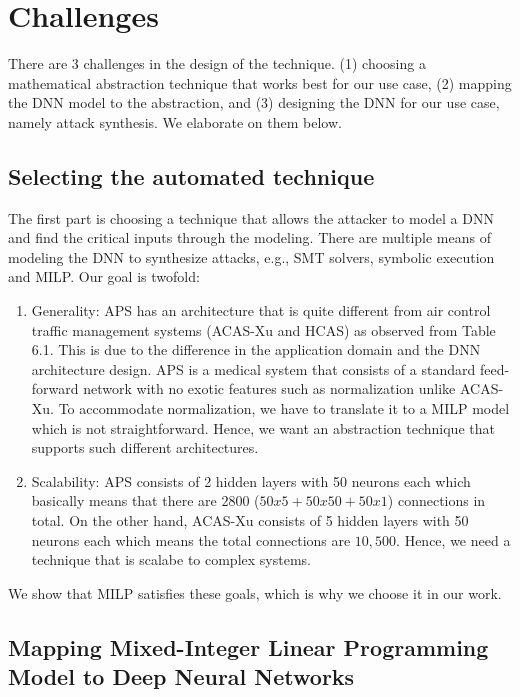 \section{Challenges}
There are 3 challenges in the design of the technique. 
(1) choosing a mathematical abstraction technique that works best for our use case, 
(2) mapping the \ac{DNN}  model to the abstraction, and 
(3) designing the \ac{DNN}  for our use case, namely attack synthesis. 
We elaborate on them below. 


\subsection{Selecting  the automated technique}
The first part is choosing a technique that allows the attacker to model a DNN and find the critical inputs through the modeling. 
There are multiple means of modeling the DNN to synthesize attacks, e.g., SMT solvers, symbolic execution and MILP.
Our goal is twofold: 
\begin{enumerate}
	\item Generality: \ac{APS} has an architecture that %
	is quite different from air control traffic management systems (\ac{ACAS-Xu} and \ac{HCAS}) as observed from Table 6.1.
	This is due to the difference in the application domain and the \ac{DNN} architecture design. 
	\ac{APS} is a medical system that consists of a standard feed-forward network with no exotic features such as normalization 
	unlike \ac{ACAS-Xu}. 
	To accommodate normalization, we have to translate it to a \ac{MILP} model which is not straightforward.  
	Hence, we want an abstraction technique that supports such different architectures. 
	\item Scalability: \ac{APS} consists of 2 hidden layers with 50 neurons each which basically means that there are $2800$ ($50x5 + 50x50 + 50x1$) connections in total.
	On the other hand, \ac{ACAS-Xu} consists of 5 hidden layers with 50 neurons each which means the total connections are $10,500$. 
	Hence, we need a technique that is scalabe to complex systems. 
	
\end{enumerate}

 We show that \ac{MILP} satisfies these goals, which is why we choose it in our work. %


\subsection{ Mapping  Mixed-Integer Linear Programming Model to Deep Neural Networks}

